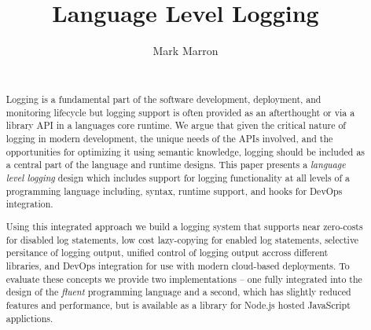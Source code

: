\documentclass[preprint]{sig-alternate-05-2015}
\newcommand{\ourtitle}{Language Level Logging}
\begin{document}





\title{\ourtitle}

\author{
Mark Marron\\
       \\
}

\maketitle

\begin{abstract} 
Logging is a fundamental part of the software development, deployment, and
monitoring lifecycle but logging support is often provided as an afterthought or
via a library API in a languages core runtime. We argue that given the critical
nature of logging in modern development, the unique needs of the APIs involved,
and the opportunities for optimizing it using semantic knowledge, logging should
be included as a central part of the language and runtime designs. This paper
presents a \emph{language level logging} design which includes support for
logging functionality at all levels of a programming language including, syntax,
runtime support, and hooks for DevOps integration.

Using this integrated approach we build a logging system that supports near
zero-costs for disabled log statements, low cost lazy-copying for enabled log
statements, selective persitance of logging output, unified control of logging
output accross different libraries, and DevOps integration for use with modern
cloud-based deployments. To evaluate these concepts we provide two
implementations -- one fully integrated into the design of the \emph{fluent}
programming language and a second, which has slightly reduced features and
performance, but is available as a library for Node.js hosted JavaScript
applictions.
\end{abstract}

\end{document}
